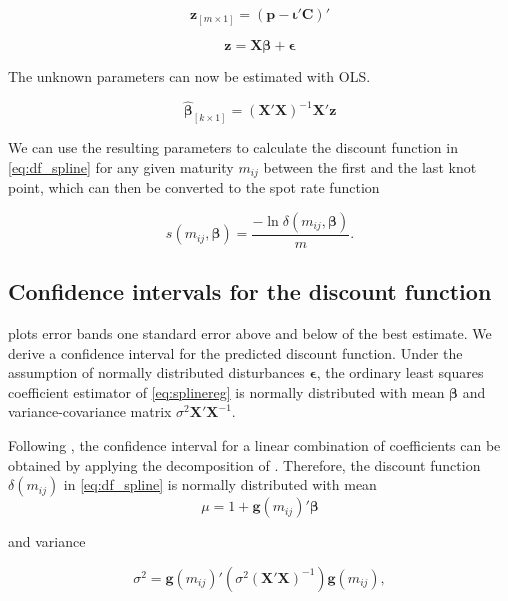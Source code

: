 \begin{equation*}
\bm{z}_{\left[m \times 1\right]}= \left(\bm{p}-\bm{\iota}'\bm{C}\right)'
\end{equation*}
       

\begin{equation}
\label{eq:splinereg}
    \bm{z}=\bm{X}\bm{\beta}+\bm{\epsilon}
\end{equation}
          
The unknown parameters can now be estimated with OLS.
	
\begin{equation*}
\label{eq:paramspline}
\bm{\hat \beta}_{\left[k\times 1\right]}= \left( \bm{X}' \bm{X}\right )^{-1}\bm{X}' \bm{z}
\end{equation*}

We can use the resulting parameters to calculate the discount function in \eqref{eq:df_spline} for any given maturity $m_{ij}$ between the first and the last knot point, which can then be converted to the spot rate function

\begin{equation*}
  \label{eq:transformdf}
  s(m_{ij},\bm{\beta}) = \frac{-\ln \delta(m_{ij},\bm{\beta})}{m}.
\end{equation*}


\subsection{Confidence intervals for the discount function}

\cite{McCulloch1975} plots error bands one standard error above and below of the best estimate. We derive a confidence interval for the predicted discount function. Under the assumption of normally distributed disturbances $\bm{\epsilon}$, the ordinary least squares coefficient estimator of \eqref{eq:splinereg} is normally distributed with mean $\bm{\beta}$ and variance-covariance matrix $\sigma^2\bm{X}'\bm{X}^{-1}$. 

Following \cite{Greene2002}, the confidence interval for a linear combination of coefficients can be obtained by applying the decomposition of \cite{Oaxaca1973}. Therefore, the discount function $\delta(m_{ij})$ in \eqref{eq:df_spline} is normally 
distributed with mean
\begin{equation*}
\mu = 1+\bm{g}(m_{ij})'\bm{\beta}
\end{equation*}

and variance

\begin{equation*}
\sigma^2 = \bm{g}(m_{ij})'\left(\sigma^2(\bm{X' X})^{-1} \right)\bm{g}(m_{ij}),
\end{equation*}

